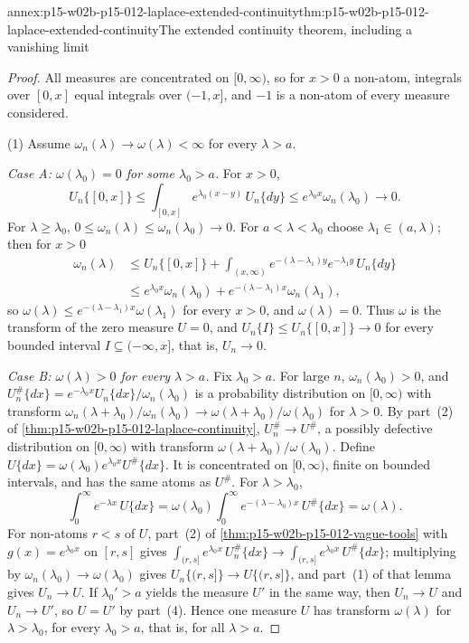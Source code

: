 \begin{annexitem}{annex:p15-w02b-p15-012-laplace-extended-continuity}{thm:p15-w02b-p15-012-laplace-extended-continuity}{The extended continuity theorem, including a vanishing limit}
\begin{proof}
All measures are concentrated on \([0,\infty)\), so for \(x>0\) a non-atom,
integrals over \([0,x]\) equal integrals over \((-1,x]\), and \(-1\) is a
non-atom of every measure considered.

(1) Assume \(\omega_n(\lambda)\to\omega(\lambda)<\infty\) for every
\(\lambda>a\).

\emph{Case A: \(\omega(\lambda_0)=0\) for some \(\lambda_0>a\).} For \(x>0\),
\[
 U_n\{[0,x]\}\leq\int_{[0,x]}e^{\lambda_0(x-y)}\,U_n\{dy\}
   \leq e^{\lambda_0x}\omega_n(\lambda_0)\longrightarrow0 .
\]
For \(\lambda\geq\lambda_0\),
\(0\leq\omega_n(\lambda)\leq\omega_n(\lambda_0)\to0\). For
\(a<\lambda<\lambda_0\) choose \(\lambda_1\in(a,\lambda)\); then for \(x>0\)
\[
 \begin{aligned}
 \omega_n(\lambda)
   &\leq U_n\{[0,x]\}+\int_{(x,\infty)}e^{-(\lambda-\lambda_1)y}e^{-\lambda_1y}\,U_n\{dy\}\\
   &\leq e^{\lambda_0x}\omega_n(\lambda_0)+e^{-(\lambda-\lambda_1)x}\omega_n(\lambda_1),
 \end{aligned}
\]
so \(\omega(\lambda)\leq e^{-(\lambda-\lambda_1)x}\omega(\lambda_1)\) for
every \(x>0\), and \(\omega(\lambda)=0\). Thus \(\omega\) is the transform of
the zero measure \(U=0\), and \(U_n\{I\}\leq U_n\{[0,x]\}\to0\) for every
bounded interval \(I\subseteq(-\infty,x]\), that is, \(U_n\to0\).

\emph{Case B: \(\omega(\lambda)>0\) for every \(\lambda>a\).} Fix
\(\lambda_0>a\). For large \(n\), \(\omega_n(\lambda_0)>0\), and
\(U_n^\#\{dx\}=e^{-\lambda_0x}U_n\{dx\}/\omega_n(\lambda_0)\) is a probability
distribution on \([0,\infty)\) with transform
\(\omega_n(\lambda+\lambda_0)/\omega_n(\lambda_0)\to\omega(\lambda+\lambda_0)/\omega(\lambda_0)\)
for \(\lambda>0\). By part~(2) of
\cref{thm:p15-w02b-p15-012-laplace-continuity}, \(U_n^\#\to U^\#\), a possibly
defective distribution on \([0,\infty)\) with transform
\(\omega(\lambda+\lambda_0)/\omega(\lambda_0)\). Define
\(U\{dx\}=\omega(\lambda_0)e^{\lambda_0x}U^\#\{dx\}\). It is concentrated on
\([0,\infty)\), finite on bounded intervals, and has the same atoms as
\(U^\#\). For \(\lambda>\lambda_0\),
\[
 \int_0^\infty e^{-\lambda x}\,U\{dx\}
   =\omega(\lambda_0)\int_0^\infty e^{-(\lambda-\lambda_0)x}\,U^\#\{dx\}
   =\omega(\lambda).
\]
For non-atoms \(r<s\) of \(U\), part~(2) of
\cref{thm:p15-w02b-p15-012-vague-tools} with \(g(x)=e^{\lambda_0x}\) on
\([r,s]\) gives \(\int_{(r,s]}e^{\lambda_0x}\,U_n^\#\{dx\}\to\int_{(r,s]}e^{\lambda_0x}\,U^\#\{dx\}\);
multiplying by \(\omega_n(\lambda_0)\to\omega(\lambda_0)\) gives
\(U_n\{(r,s]\}\to U\{(r,s]\}\), and part~(1) of that lemma gives
\(U_n\to U\). If \(\lambda_0'>a\) yields the measure \(U'\) in the same way,
then \(U_n\to U\) and \(U_n\to U'\), so \(U=U'\) by part~(4). Hence one measure
\(U\) has transform \(\omega(\lambda)\) for \(\lambda>\lambda_0\), for every
\(\lambda_0>a\), that is, for all \(\lambda>a\).


\end{proof}
\end{annexitem}
